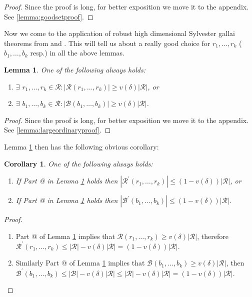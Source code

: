 \documentclass[12pt]{caltech_thesis}
\makeatletter
\theoremstyle{plain}
\newtheorem{corollary}{Corollary}
\newtheorem{lemma}{Lemma}
\theoremstyle{definition}
\newcommand{\MB}{\mathcal{B}}
\newcommand{\MR}{\mathcal{R}}
\newcommand*{\rom}[1]{\expandafter\@slowromancap\romannumeral #1@}
\makeatother
\begin{document}
\begin{proof}
 Since the proof is long, for better exposition we move it to the appendix. See \ref{lemma:goodsetproof}.
\end{proof} 
 
 Now we come to the application of robust high dimensional Sylvester gallai theorems from \cite{BDWY11} and \cite{DSW12}.
 This will tell us about a really good choice for $r_1,\ldots,r_k$ ($b_1,\ldots,b_k$ resp.) in all the above lemmas.
 

\begin{lemma}\label{lemma:largeordinary}
 One of the following always holds:
 \begin{enumerate}
  \item \label{bullet:redlarge} $\exists$ $r_1,\ldots,r_k \in \MR :  |\MR(r_1,\ldots,r_k)|\geq v(\delta)|\MR|$,  or 
  
  \item \label{bullet:bluelarge} $\exists$ $b_1,\ldots,b_k \in \MR :  |\MB(b_1,\ldots,b_k)|\geq v(\delta)|\MR|$.
  
 \end{enumerate}
 
\end{lemma}
\begin{proof}
 Since the proof is long, for better exposition we move it to the appendix. See \ref{lemma:largeordinaryproof}.
\end{proof}



Lemma \ref{lemma:largeordinary} then has the following obvious corollary:
\begin{corollary}\label{corollary:largeordinary}
  One of the following always holds:
 \begin{enumerate}
  \item If Part \rom{1} in Lemma \ref{lemma:largeordinary} holds then  $|\MR^\prime(r_1,\ldots,r_k)|\leq (1-v(\delta))|\MR|$,  or 
  
  \item If Part \rom{2} in Lemma \ref{lemma:largeordinary} holds then  $|\MB^\prime(b_1,\ldots,b_k)|\leq (1-v(\delta))|\MR|$.
  
 \end{enumerate}
\end{corollary}
\begin{proof}
 \begin{enumerate}
  \item Part \rom{1} of Lemma \ref{lemma:largeordinary} implies that 
  $\MR(r_1,\ldots,r_k) \geq v(\delta) |\MR|$, therefore $\MR^\prime(r_1,\ldots,r_k) \leq |\MR|-v(\delta) |\MR| =  
  (1-v(\delta))|\MR|$.
  \item Similarly Part \rom{2} of Lemma \ref{lemma:largeordinary} implies that 
  $\MB(b_1,\ldots,b_k) \geq v(\delta) |\MR|$, then $\MB^\prime(b_1,\ldots,b_k) \leq |\MB|-v(\delta) |\MR|\leq 
  |\MR| -v(\delta) |\MR| = (1-v(\delta))|\MR|$.
 \end{enumerate}
\end{proof} 
 
\end{document}
